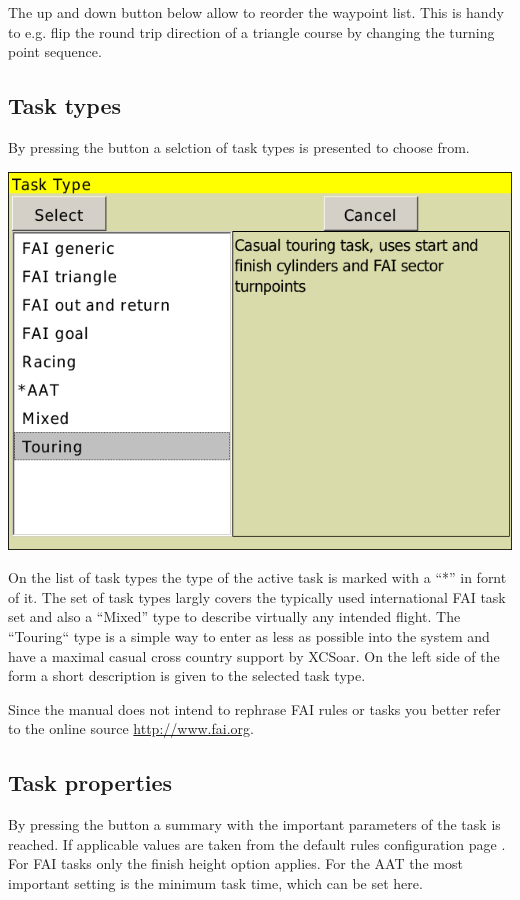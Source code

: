 \documentclass[a4paper,12pt]{refrep}
\begin{document}
The up and down button below allow to reorder the waypoint list. This is handy
to e.g. flip the round trip direction of a triangle course by changing the
turning point sequence.

\subsection*{Task types}
By pressing the  button a selction of task types is presented to
choose  from.
\begin{center}
\includegraphics[angle=0,width=0.8\linewidth,keepaspectratio='true']{figures/dialog-taskedit1.png}
\end{center}
On the list of task types the type of the active task is marked with a ``*'' in
fornt of it. The set of task types largly covers the typically used
international FAI task set and also a ``Mixed'' type to describe virtually any
intended flight. The ``Touring`` type is a simple way to enter as less
as possible into the system and have a maximal casual cross country support by
XCSoar.  On the left side of the form a short description is given to the
selected task type.

Since the manual does not intend to rephrase FAI rules or tasks you better refer
to the online source  \url{http://www.fai.org}. 


\subsection*{Task properties}
By pressing the  button a summary with the important
parameters of the task is reached.  If applicable values are taken from the
default rules configuration page .  For FAI tasks only the
finish height option applies. For the AAT the most important setting is the
minimum task time, which can be set here.
\end{document}
